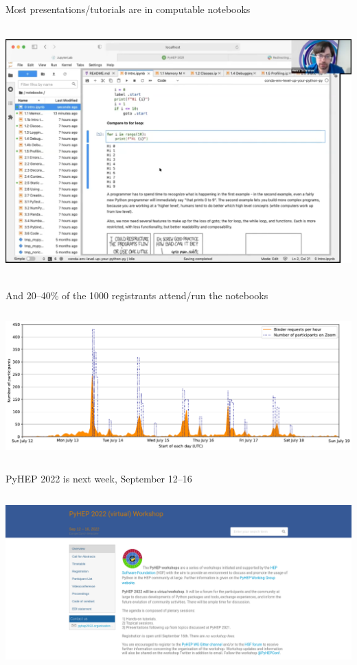 \documentclass[aspectratio=169]{beamer}
\begin{document}
\begin{frame}{Most presentations/tutorials are in computable notebooks}
\vspace{0.35 cm}

\mbox{ } \hfill \includegraphics[width=0.85\linewidth]{PLOTS/pyhep-2018-notebook-screenshot.png} \hfill \mbox{ }
\end{frame}

\begin{frame}{And 20--40\% of the 1000 registrants attend/run the notebooks}
\vspace{0.5 cm}

\begin{columns}
\includegraphics[width=\linewidth]{PLOTS/binder-launches-zoom-attendance.pdf}
\end{columns}
\end{frame}

\begin{frame}{PyHEP 2022 is next week, September 12--16}
\vspace{-0.1 cm}

\begin{columns}
\includegraphics[width=\linewidth]{PLOTS/pyhep-2022-screenshot.png}
\end{columns}
\end{frame}
\end{document}
